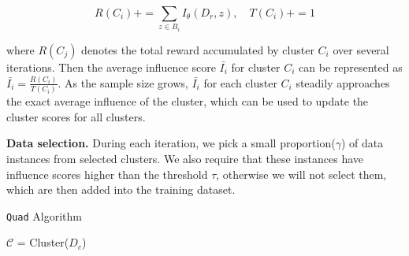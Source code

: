 \documentclass{article} %
\begin{document}



\begin{equation}
    R(C_i) += \sum_{z \in B_i}I_\theta(D_r,z)  , \quad T(C_i) += 1
\end{equation}

where $R(C_j)$ denotes the total reward accumulated by cluster $C_i$ over several iterations.%
Then the average influence score $\bar{I_{i}}$ for cluster $C_i$ can be represented as
    $\bar{I_i} = \frac{R(C_i)}{T(C_i)}$.
As the sample size grows, $\bar{I_i}$ for each cluster $C_i$ steadily approaches the exact average influence of the cluster, which can be used to update the cluster scores for all clusters.

\textbf{Data selection.} During each iteration, we pick a small proportion($\gamma$) of data instances from selected clusters. We also require that these instances have influence scores higher than the threshold $\tau$, otherwise we will not select them, which are then added into the training dataset.




\begin{algorithm}[h]
    \caption{\texttt{Quad} Algorithm}
    $\mathcal{C}$ = Cluster($D_c$)\;
    \;
\end{algorithm}
\end{document}
